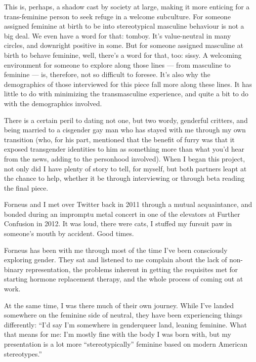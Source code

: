 This is, perhaps, a shadow cast by society at large, making it more enticing for a trans-feminine person to seek refuge in a welcome subculture. For someone assigned feminine at birth to be into stereotypical masculine behaviour is not a big deal. We even have a word for that: tomboy. It's value-neutral in many circles, and downright positive in some. But for someone assigned masculine at birth to behave feminine, well, there's a word for that, too: sissy. A welcoming environment for someone to explore along those lines --- from masculine to feminine --- is, therefore, not so difficult to foresee. It's also why the demographics of those interviewed for this piece fall more along these lines. It has little to do with minimizing the transmasculine experience, and quite a bit to do with the demographics involved.

\secdiv

There is a certain peril to dating not one, but two wordy, genderful critters, and being married to a cisgender gay man who has stayed with me through my own transition (who, for his part, mentioned that the benefit of furry was that it exposed transgender identities to him as something more than what you'd hear from the news, adding to the personhood involved). When I began this project, not only did I have plenty of story to tell, for myself, but both partners leapt at the chance to help, whether it be through interviewing or through beta reading the final piece.

Forneus and I met over Twitter back in 2011 through a mutual acquaintance, and bonded during an impromptu metal concert in one of the elevators at Further Confusion in 2012. It was loud, there were cats, I stuffed my fursuit paw in someone's mouth by accident. Good times.

Forneus has been with me through most of the time I've been consciously exploring gender. They sat and listened to me complain about the lack of non-binary representation, the problems inherent in getting the requisites met for starting hormone replacement therapy, and the whole process of coming out at work.

At the same time, I was there much of their own journey. While I've landed somewhere on the feminine side of neutral, they have been experiencing things differently: ``I'd say I'm somewhere in genderqueer land, leaning feminine. What that means for me: I'm mostly fine with the body I was born with, but my presentation is a lot more ``stereotypically'' feminine based on modern American stereotypes.''

